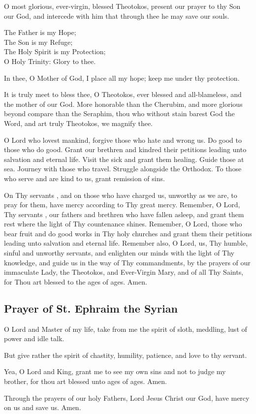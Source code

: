 O most glorious, ever-virgin, blessed Theotokos, present our prayer to thy Son our God, and intercede with him that through thee he may save our souls.

The Father is my Hope; \\
The Son is my Refuge; \\
The Holy Spirit is my Protection; \\
O Holy Trinity: Glory to thee.

In thee, O Mother of God, I place all my hope; keep me under thy protection.

It is truly meet to bless thee, O Theotokos, ever blessed and all-blameless, and the mother of our God. More honorable than the Cherubim, and more glorious beyond compare than the Seraphim, thou who without stain barest God the Word, and art truly Theotokos, we magnify thee.

O Lord who lovest mankind, forgive those who hate and wrong us. Do good to those who do good. Grant our brethren and kindred their petitions leading unto salvation and eternal life. Visit the sick and grant them healing. Guide those at sea. Journey with those who travel. Struggle alongside the Orthodox. To those who serve and are kind to us, grant remission of sins.

On Thy servants , and on those who have charged us, unworthy as we are, to pray for them, have mercy according to Thy great mercy. Remember, O Lord, Thy servants , our fathers and brethren who have fallen asleep, and grant them rest where the light of Thy countenance shines. Remember, O Lord, those who bear fruit and do good works in Thy holy churches and grant them their petitions leading unto salvation and eternal life. Remember also, O Lord, us, Thy humble, sinful and unworthy servants, and enlighten our minds with the light of Thy knowledge, and guide us in the way of Thy commandments, by the prayers of our immaculate Lady, the Theotokos, and Ever-Virgin Mary, and of all Thy Saints, for Thou art blessed to the ages of ages. Amen. 

\subsection{Prayer of St. Ephraim the Syrian}


O Lord and Master of my life, take from me the spirit of sloth, meddling, lust of power and idle talk. 

But give rather the spirit of chastity, humility, patience, and love to thy servant. 

Yea, O Lord and King, grant me to see my own sins and not to judge my brother, for thou art blessed unto ages of ages. Amen. 


Through the prayers of our holy Fathers, Lord Jesus Christ our God, have mercy on us and save us. Amen.

\cleardoublepage
